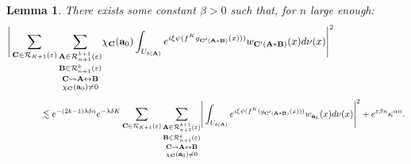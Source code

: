 \documentclass[a4paper]{article}
\newtheorem{lemma}[theorem]{Lemma}
\theoremstyle{definition}
\begin{document}
\begin{lemma}
There exists some constant $\beta>0$ such that, for $n$ large enough:
$$ \Bigg{|} \sum_{\mathbf{C} \in \mathcal{R}_{K+1}(\varepsilon)} \underset{\chi_{\mathbf{C}}(\mathbf{a}_0) \neq 0}{\underset{\mathbf{C} \rightsquigarrow \mathbf{A} \leftrightarrow \mathbf{B}}{ \underset{ \mathbf{B} \in \mathcal{R}_{n+1}^k(\varepsilon)}{ \underset{\mathbf{A} \in \mathcal{R}_{n+1}^{k+1}(\varepsilon) }{ \sum}} }} \chi_{\mathbf{C}}(\mathbf{a}_0) \int_{U_{b(\mathbf{A})}} e^{i \xi \psi( f^K g_{\mathbf{C}'(\mathbf{A} * \mathbf{B})}(x)))} w_{\mathbf{C}'(\mathbf{A} * \mathbf{B})}(x) d\nu(x) \Bigg{|}^2 \quad \quad \quad \quad \quad \quad \quad  $$
$$ \quad \quad \quad \quad \lesssim  e^{-(2k-1) \lambda \delta n} e^{- \lambda \delta K} \sum_{\mathbf{C} \in \mathcal{R}_{K+1}(\varepsilon)} \underset{\chi_{\mathbf{C}}(\mathbf{a}_0) \neq 0}{\underset{\mathbf{C} \rightsquigarrow \mathbf{A} \leftrightarrow \mathbf{B}}{ \underset{ \mathbf{B} \in \mathcal{R}_{n+1}^k(\varepsilon)}{ \underset{\mathbf{A} \in \mathcal{R}_{n+1}^{k+1}(\varepsilon) }{ \sum}} }} \Bigg{|} \int_{U_{b(\mathbf{A})}}  e^{i \xi \psi( f^K( g_{\mathbf{C}'(\mathbf{A} * \mathbf{B})}(x)))} w_{\mathbf{a}_k}(x) d\nu(x) \Bigg{|}^2 + e^{\varepsilon \beta n} \kappa^{\alpha n}. $$
\end{lemma}
\end{document}
